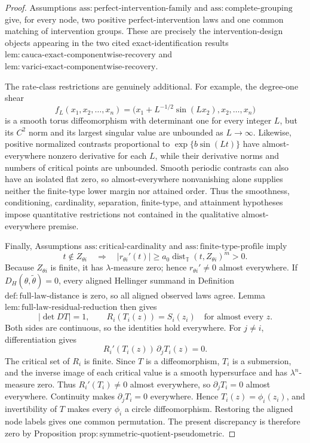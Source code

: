 \documentclass{article}
\begin{document}
\begin{proof}
Assumptions \(\mathrm{ass:perfect\text{-}intervention\text{-}family}\) and \(\mathrm{ass:complete\text{-}grouping}\) give, for every node, two positive perfect-intervention laws and one common matching of intervention groups. These are precisely the intervention-design objects appearing in the two cited exact-identification results \(\mathrm{lem:cauca\text{-}exact\text{-}componentwise\text{-}recovery}\) and \(\mathrm{lem:varici\text{-}exact\text{-}componentwise\text{-}recovery}\).

The rate-class restrictions are genuinely additional. For example, the degree-one shear
\[
f_L(x_1,x_2,\ldots,x_n)
=\bigl(x_1+L^{-1/2}\sin(Lx_2),x_2,\ldots,x_n\bigr)
\]
is a smooth torus diffeomorphism with determinant one for every integer \(L\), but its \(C^2\) norm and its largest singular value are unbounded as \(L\to\infty\). Likewise, positive normalized contrasts proportional to \(\exp\{b\sin(Lt)\}\) have almost-everywhere nonzero derivative for each \(L\), while their derivative norms and numbers of critical points are unbounded. Smooth periodic contrasts can also have an isolated flat zero, so almost-everywhere nonvanishing alone supplies neither the finite-type lower margin nor attained order. Thus the smoothness, conditioning, cardinality, separation, finite-type, and attainment hypotheses impose quantitative restrictions not contained in the qualitative almost-everywhere premise.

Finally, Assumptions \(\mathrm{ass:critical\text{-}cardinality}\) and \(\mathrm{ass:finite\text{-}type\text{-}profile}\) imply
\[
t\notin Z_{\theta i}
\quad\Longrightarrow\quad
|r_{\theta i}'(t)|\ge a_0\operatorname{dist}_{\mathbb T}(t,Z_{\theta i})^m>0.
\]
Because \(Z_{\theta i}\) is finite, it has \(\lambda\)-measure zero; hence \(r_{\theta i}'\ne0\) almost everywhere. If \(D_H(\theta,\widetilde\theta)=0\), every aligned Hellinger summand in Definition \(\mathrm{def:full\text{-}law\text{-}distance}\) is zero, so all aligned observed laws agree. Lemma \(\mathrm{lem:full\text{-}law\text{-}residual\text{-}reduction}\) then gives
\[
|\det DT|=1,\qquad R_i(T_i(z))=S_i(z_i)\quad\text{for almost every }z.
\]
Both sides are continuous, so the identities hold everywhere. For \(j\ne i\), differentiation gives
\[
R_i'(T_i(z))\,\partial_jT_i(z)=0.
\]
The critical set of \(R_i\) is finite. Since \(T\) is a diffeomorphism, \(T_i\) is a submersion, and the inverse image of each critical value is a smooth hypersurface and has \(\lambda^n\)-measure zero. Thus \(R_i'(T_i)\ne0\) almost everywhere, so \(\partial_jT_i=0\) almost everywhere. Continuity makes \(\partial_jT_i=0\) everywhere. Hence \(T_i(z)=\phi_i(z_i)\), and invertibility of \(T\) makes every \(\phi_i\) a circle diffeomorphism. Restoring the aligned node labels gives one common permutation. The present discrepancy is therefore zero by Proposition \(\mathrm{prop:symmetric\text{-}quotient\text{-}pseudometric}\).


\end{proof}
\end{document}
